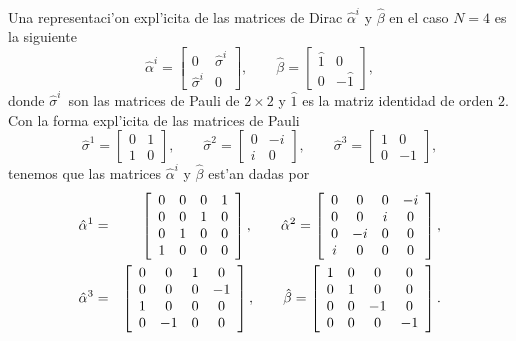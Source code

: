 Una representaci'on expl'icita de las matrices de Dirac $\hat{\alpha}^i$ y
$\hat{\beta}$ en el caso $N=4$ es la siguiente 
\begin{equation}
\hat{\alpha}^i=\left[ 
\begin{array}{cc}
0 & \hat{\sigma}^i \\ 
\hat{\sigma}^i & 0
\end{array}
\right] ,\qquad \hat{\beta}=\left[ 
\begin{array}{cc}
\hat{1} & 0 \\ 
0 & -\hat{1}
\end{array}
\right] , 
\label{DiracMatPauli}
\end{equation}
donde $\hat{\sigma}^i$\ son las matrices de Pauli de $2\times 2$ y $\hat{1}$
es la matriz identidad de orden $2$. Con la forma expl'icita de las matrices de
Pauli 
\begin{equation}
\hat{\sigma}^1=\left[ 
\begin{array}{cc}
0 & 1 \\ 
1 & 0
\end{array}
\right] ,\qquad \hat{\sigma}^2=\left[ 
\begin{array}{cc}
0 & -i \\ 
i & 0
\end{array}
\right] ,\qquad \hat{\sigma}^{3}=\left[ 
\begin{array}{cc}
1 & 0 \\ 
0 & -1
\end{array}
\right] ,
\end{equation}
tenemos que las matrices $\hat{\alpha}^i$ y $\hat{\beta}$ est'an dadas por
\begin{eqnarray}
\hat{\alpha}^1 &=&\left[ 
\begin{array}{cccc}
0 & 0 & 0 & 1 \\ 
0 & 0 & 1 & 0 \\
0 & 1 & 0 & 0 \\ 
1 & 0 & 0 & 0
\end{array}
\right] ,\qquad \hat{\alpha}^2=\left[ 
\begin{array}{cccc}
0 & 0 & 0 & -i \\ 
0 & 0 & i & 0 \\ 
0 & -i & 0 & 0 \\ 
i & 0 & 0 & 0
\end{array}
\right] , \notag \\
\hat{\alpha}^{3} &=&\left[ 
\begin{array}{cccc}
0 & 0 & 1 & 0 \\ 
0 & 0 & 0 & -1 \\ 
1 & 0 & 0 & 0 \\ 
0 & -1 & 0 & 0
\end{array}
\right] ,\qquad \hat{\beta}=\left[ 
\begin{array}{cccc}
1 & 0 & 0 & 0 \\ 
0 & 1 & 0 & 0 \\ 
0 & 0 & -1 & 0 \\ 
0 & 0 & 0 & -1
\end{array}
\right] . \label{DiracMat}
\end{eqnarray}
